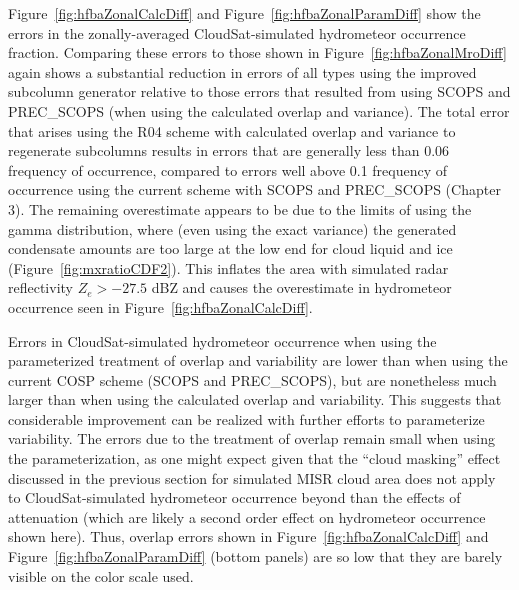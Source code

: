 Figure~\ref{fig:hfbaZonalCalcDiff} and
Figure~\ref{fig:hfbaZonalParamDiff} show the errors in the
zonally-averaged CloudSat-simulated hydrometeor occurrence fraction.
Comparing these errors to those shown in
Figure~\ref{fig:hfbaZonalMroDiff} again shows a substantial reduction in
errors of all types using the improved subcolumn generator relative to
those errors that resulted from using SCOPS and PREC\_SCOPS (when using
the calculated overlap and variance). The total error that arises using
the R04 scheme with calculated overlap and variance to regenerate
subcolumns results in errors that are generally less than 0.06 frequency
of occurrence, compared to errors well above 0.1 frequency of occurrence
using the current scheme with SCOPS and PREC\_SCOPS (Chapter 3). The
remaining overestimate appears to be due to the limits of using the
gamma distribution, where (even using the exact variance) the generated
condensate amounts are too large at the low end for cloud liquid and ice
(Figure~\ref{fig:mxratioCDF2}). This inflates the area with simulated
radar reflectivity \(Z_e > -27.5\) dBZ and causes the overestimate in
hydrometeor occurrence seen in Figure~\ref{fig:hfbaZonalCalcDiff}.

Errors in CloudSat-simulated hydrometeor occurrence when using the
parameterized treatment of overlap and variability are lower than when
using the current COSP scheme (SCOPS and PREC\_SCOPS), but are
nonetheless much larger than when using the calculated overlap and
variability. This suggests that considerable improvement can be realized
with further efforts to parameterize variability. The errors due to the
treatment of overlap remain small when using the parameterization, as
one might expect given that the ``cloud masking'' effect discussed in
the previous section for simulated MISR cloud area does not apply to
CloudSat-simulated hydrometeor occurrence beyond than the effects of
attenuation (which are likely a second order effect on hydrometeor
occurrence shown here). Thus, overlap errors shown in
Figure~\ref{fig:hfbaZonalCalcDiff} and
Figure~\ref{fig:hfbaZonalParamDiff} (bottom panels) are so low that they
are barely visible on the color scale used.

